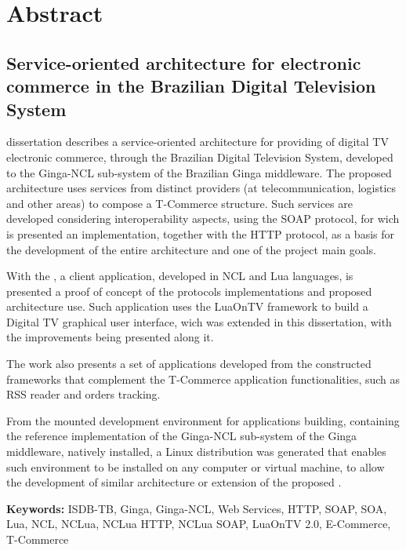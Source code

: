 \chapter{Abstract}

\section*{Service-oriented architecture for electronic commerce in the Brazilian Digital Television System}

 dissertation describes a service-oriented architecture for providing of digital TV electronic commerce, 
through the Brazilian Digital Television System,
developed to the Ginga-NCL sub-system of the Brazilian Ginga middleware.
The proposed architecture uses services from distinct providers
(at telecommunication, logistics and other areas) to compose a T-Commerce structure. 
Such services are developed considering interoperability aspects,
using the SOAP protocol, for wich is presented
an implementation, together with the HTTP protocol, as a basis
for the development of the entire architecture and 
one of the project main goals.

With the , a client application, developed
in NCL and Lua languages, is presented  a proof of concept
of the protocols implementations and proposed architecture use.
Such application uses the LuaOnTV framework to build
a Digital TV graphical user interface, wich was extended in this dissertation, with the improvements being presented along it.

The work also presents a set of applications developed from
the constructed frameworks that complement the T-Commerce application functionalities, 
such as RSS reader and orders tracking.

From the mounted development environment for applications building,
containing the reference implementation of the  Ginga-NCL sub-system of the Ginga middleware,
natively installed, a Linux distribution was generated that enables such environment
to be installed on any computer or virtual machine, to allow the development
of similar architecture or extension of the proposed .


\textbf{Keywords:} ISDB-TB, Ginga, Ginga-NCL, Web Services, HTTP, SOAP, SOA, Lua, NCL, NCLua, NCLua HTTP, NCLua SOAP, LuaOnTV 2.0, 
E-Commerce, T-Commerce
